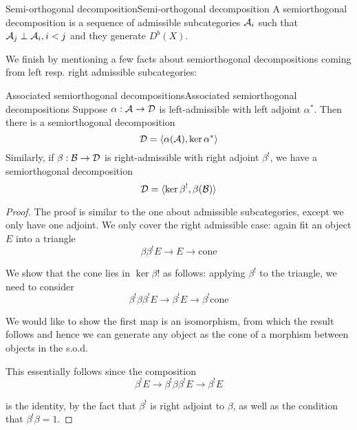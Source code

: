 
\begin{definition}{Semi-orthogonal decomposition}{Semi-orthogonal decomposition}
    A semiorthogonal decomposition is a sequence of admissible subcategories $\mathcal{A}_{i}$ such that $\mathcal{A}_{j}\perp \mathcal{A}_{i}, i<j$ and they generate $D^b(X)$.
\end{definition}

We finish by mentioning a few facts about semiorthogonal decompositions coming from left resp. right admissible subcategories:

\begin{proposition}{Associated semiorthogonal decompositions}{Associated semiorthogonal decompositions}
    Suppose $\alpha: \mathcal{A} \rightarrow \mathcal{D}$ is left-admissible with left adjoint $\alpha^*$. Then there is a semiorthogonal decomposition $$\mathcal{D} = \langle \alpha(\mathcal{A}), \ker \alpha^*\rangle $$
    Similarly, if $\beta:\mathcal{B}\rightarrow \mathcal{D}$ is right-admissible with right adjoint $\beta^!$, we have a semiorthogonal decomposition $$\mathcal{D}=\langle \ker \beta^!, \beta(\mathcal{B})\rangle$$
\end{proposition}

\begin{proof}
    The proof is similar to the one about admissible subcategories, except we only have one adjoint. We only cover the right admissible case: again fit an object $E$ into a triangle $$\beta \beta^! E \rightarrow E \rightarrow \mathrm{cone}$$

    We show that the cone lies in $\ker \beta!$ as follows: applying $\beta^!$ to the triangle, we need to consider $$\beta^! \beta \beta^!E \rightarrow \beta^! E\rightarrow \beta^! \mathrm{cone}$$

    We would like to show the first map is an isomorphism, from which the result follows and hence we can generate any object as the cone of a morphism between objects in the s.o.d.

    This essentially follows since the composition $$\beta^!E \rightarrow \beta^! \beta \beta^! E \rightarrow \beta^!E$$

    is the identity, by the fact that $\beta^!$ is right adjoint to $\beta$, as well as the condition that $\beta^!\beta=1$.
\end{proof}

